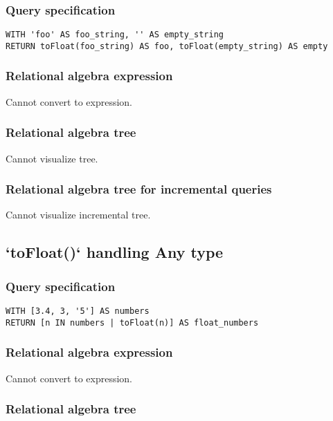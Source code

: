\subsubsection*{Query specification}

\begin{lstlisting}
WITH 'foo' AS foo_string, '' AS empty_string
RETURN toFloat(foo_string) AS foo, toFloat(empty_string) AS empty
\end{lstlisting}

\subsubsection*{Relational algebra expression}

Cannot convert to expression.

\subsubsection*{Relational algebra tree}

Cannot visualize tree.

\subsubsection*{Relational algebra tree for incremental queries}

Cannot visualize incremental tree.

\subsection{`toFloat()` handling Any type}

\subsubsection*{Query specification}

\begin{lstlisting}
WITH [3.4, 3, '5'] AS numbers
RETURN [n IN numbers | toFloat(n)] AS float_numbers
\end{lstlisting}

\subsubsection*{Relational algebra expression}

Cannot convert to expression.

\subsubsection*{Relational algebra tree}

